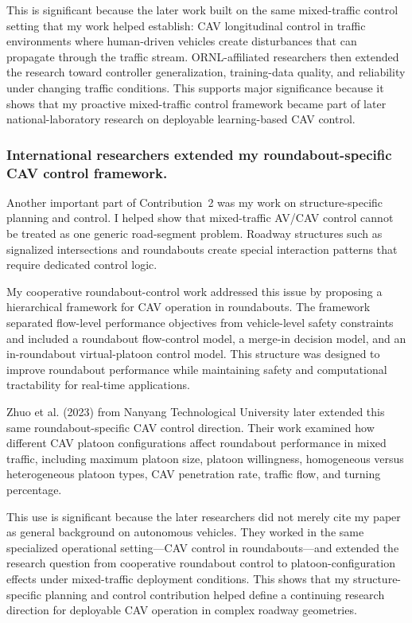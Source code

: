 \documentclass[11pt,letterpaper]{article}
\begin{document}
This is significant because the later work built on the same mixed-traffic control setting that my work helped establish: CAV longitudinal control in traffic environments where human-driven vehicles create disturbances that can propagate through the traffic stream. ORNL-affiliated researchers then extended the research toward controller generalization, training-data quality, and reliability under changing traffic conditions. This supports major significance because it shows that my proactive mixed-traffic control framework became part of later national-laboratory research on deployable learning-based CAV control.

\subsubsection{International researchers extended my roundabout-specific CAV control framework.}

Another important part of Contribution~2 was my work on structure-specific planning and control. I helped show that mixed-traffic AV/CAV control cannot be treated as one generic road-segment problem. Roadway structures such as signalized intersections and roundabouts create special interaction patterns that require dedicated control logic.

My cooperative roundabout-control work addressed this issue by proposing a hierarchical framework for CAV operation in roundabouts. The framework separated flow-level performance objectives from vehicle-level safety constraints and included a roundabout flow-control model, a merge-in decision model, and an in-roundabout virtual-platoon control model. This structure was designed to improve roundabout performance while maintaining safety and computational tractability for real-time applications.

Zhuo et al. (2023) from Nanyang Technological University later extended this same roundabout-specific CAV control direction. Their work examined how different CAV platoon configurations affect roundabout performance in mixed traffic, including maximum platoon size, platoon willingness, homogeneous versus heterogeneous platoon types, CAV penetration rate, traffic flow, and turning percentage.

This use is significant because the later researchers did not merely cite my paper as general background on autonomous vehicles. They worked in the same specialized operational setting---CAV control in roundabouts---and extended the research question from cooperative roundabout control to platoon-configuration effects under mixed-traffic deployment conditions. This shows that my structure-specific planning and control contribution helped define a continuing research direction for deployable CAV operation in complex roadway geometries.
\end{document}

